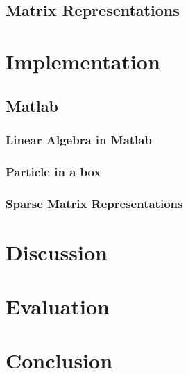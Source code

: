 \documentclass[authoryearcitations]{UoYCSproject}
\begin{document}
\section{Matrix Representations}

\chapter{Implementation}
\section{Matlab}

\subsection{Linear Algebra in Matlab}


\subsection{Particle in a box}

\subsection{Sparse Matrix Representations}


\chapter{Discussion}

\chapter{Evaluation}

\chapter{Conclusion}


\end{document}
